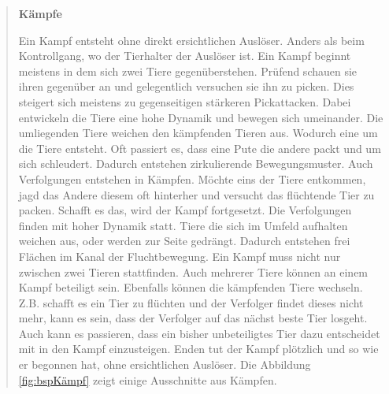 \begin{quote}
\textbf{Kämpfe}\par
Ein Kampf entsteht ohne direkt ersichtlichen Auslöser. Anders als beim Kontrollgang, wo der Tierhalter der Auslöser ist. Ein Kampf beginnt meistens in dem sich zwei Tiere gegenüberstehen. Prüfend schauen sie ihren gegenüber an und gelegentlich versuchen sie ihn zu picken. Dies steigert sich meistens zu gegenseitigen stärkeren Pickattacken. Dabei entwickeln die Tiere eine hohe Dynamik und bewegen sich umeinander. Die umliegenden Tiere weichen den kämpfenden Tieren aus. Wodurch eine  um die Tiere entsteht. Oft passiert es, dass eine Pute die andere packt und um sich schleudert. Dadurch entstehen zirkulierende Bewegungsmuster. Auch Verfolgungen entstehen in Kämpfen. Möchte eins der Tiere entkommen, jagd das Andere diesem oft hinterher und versucht das flüchtende Tier zu packen. Schafft es das, wird der Kampf fortgesetzt. Die Verfolgungen finden mit hoher Dynamik statt. Tiere die sich im Umfeld aufhalten weichen aus, oder werden zur Seite gedrängt. Dadurch entstehen frei Flächen im Kanal der Fluchtbewegung. Ein Kampf muss nicht nur zwischen zwei Tieren stattfinden. Auch mehrerer Tiere können an einem Kampf beteiligt sein. Ebenfalls können die kämpfenden Tiere wechseln. Z.B. schafft es ein Tier zu flüchten und der Verfolger findet dieses nicht mehr, kann es sein, dass der Verfolger auf das nächst beste Tier losgeht. Auch kann es passieren, dass ein bisher unbeteiligtes Tier dazu entscheidet mit in den Kampf einzusteigen. Enden tut der Kampf plötzlich und so wie er begonnen hat, ohne ersichtlichen Auslöser. Die Abbildung \ref{fig:bspKämpf} zeigt einige Ausschnitte aus Kämpfen.
\end{quote}

